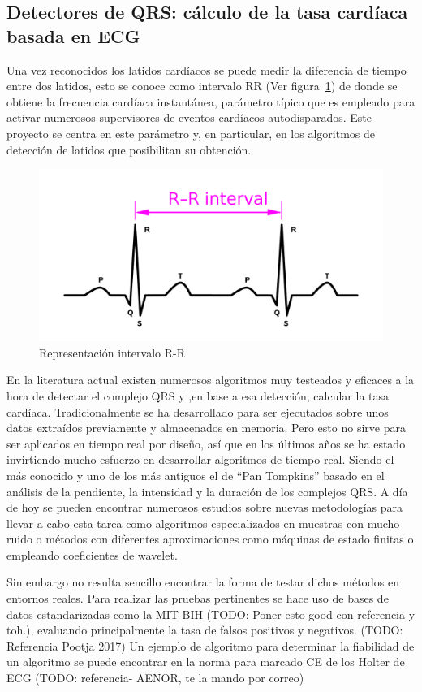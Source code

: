 \subsection{Detectores de QRS: cálculo de la tasa cardíaca basada en ECG}

Una vez reconocidos los latidos cardíacos se puede medir la diferencia de tiempo entre dos latidos, esto se conoce como intervalo RR (Ver figura~\ref{fig:RRInterval})  de donde se obtiene la frecuencia cardíaca instantánea, parámetro típico que es empleado para activar numerosos supervisores de eventos cardíacos autodisparados. Este proyecto se centra en este parámetro y, en particular, en los algoritmos de detección de latidos que posibilitan su obtención.  

\begin{figure}[ht]
	\centering
		\includegraphics[width=0.6\linewidth]{figuras/RRInterval.png}
	\caption{Representación intervalo R-R}
	\label{fig:RRInterval}
\end{figure} 

En la literatura actual existen numerosos algoritmos muy testeados y eficaces a la hora de detectar el complejo QRS y ,en base a esa detección, calcular la tasa cardíaca. Tradicionalmente se ha desarrollado para ser ejecutados sobre unos datos extraídos previamente y almacenados en memoria. Pero esto no sirve para ser aplicados en tiempo real por diseño, así que en los últimos años se ha estado invirtiendo mucho esfuerzo en desarrollar algoritmos de tiempo real. Siendo el más conocido y uno de los más antiguos el de “Pan Tompkins” basado en el análisis de la pendiente, la intensidad y la duración de los complejos QRS.\cite{PanTompkins} A día de hoy se pueden encontrar numerosos estudios sobre nuevas metodologías para llevar a cabo esta tarea como algoritmos especializados en muestras con mucho ruido\cite{RsSlope} o métodos con diferentes aproximaciones como máquinas de estado finitas\cite{FSM} o empleando coeficientes de wavelet.\cite{Wavelet}

Sin embargo no resulta sencillo encontrar la forma de testar dichos métodos en entornos reales. Para realizar las pruebas pertinentes se hace uso de bases de datos estandarizadas como la MIT-BIH (TODO: Poner esto good con referencia y toh.), evaluando principalmente la tasa de falsos positivos y negativos. (TODO: Referencia Pootja 2017) Un ejemplo de algoritmo para determinar la fiabilidad de un algoritmo se puede encontrar en la norma para marcado CE de los Holter de ECG (TODO: referencia- AENOR, te la mando por correo)

